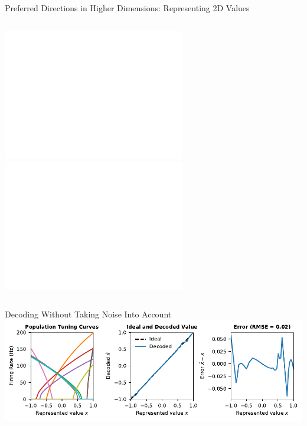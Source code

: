 \documentclass[handout,aspectratio=169]{beamer}
\begin{document}
\begin{frame}{Preferred Directions in Higher Dimensions: Representing 2D Values}
	\begin{columns}[c]
		\centering
		\includegraphics<1->[height=5.75cm,trim=1cm 0cm 0cm 1cm,clip]{media/2d_encoder_tuning_curve.pdf}
		\centering
		\includegraphics<2->[height=5.75cm]{media/2d_encoder_tuning_curve_unit.pdf}	
	\end{columns}
\end{frame}

\begin{frame}{Decoding Without Taking Noise Into Account}
	\includegraphics[width=\textwidth]{media/decoding_example_no_noise.pdf}
\end{frame}
\end{document}
